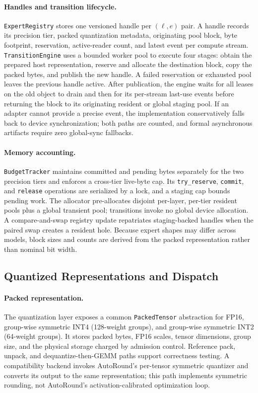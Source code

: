 \paragraph{Handles and transition lifecycle.}
\texttt{ExpertRegistry} stores one versioned handle per $(\ell,e)$ pair. A handle records its precision tier, packed quantization metadata, originating pool block, byte footprint, reservation, active-reader count, and latest event per compute stream. \texttt{TransitionEngine} uses a bounded worker pool to execute four stages: obtain the prepared host representation, reserve and allocate the destination block, copy the packed bytes, and publish the new handle. A failed reservation or exhausted pool leaves the previous handle active. After publication, the engine waits for all leases on the old object to drain and then for its per-stream last-use events before returning the block to its originating resident or global staging pool. If an adapter cannot provide a precise event, the implementation conservatively falls back to device synchronization; both paths are counted, and formal asynchronous artifacts require zero global-sync fallbacks.

\paragraph{Memory accounting.}
\texttt{BudgetTracker} maintains committed and pending bytes separately for the two precision tiers and enforces a cross-tier live-byte cap. Its \texttt{try\_reserve}, \texttt{commit}, and \texttt{release} operations are serialized by a lock, and a staging cap bounds pending work. The allocator pre-allocates disjoint per-layer, per-tier resident pools plus a global transient pool; transitions invoke no global device allocation. A compare-and-swap registry update repatriates staging-backed handles when the paired swap creates a resident hole. Because expert shapes may differ across models, block sizes and counts are derived from the packed representation rather than nominal bit width.

\subsection{Quantized Representations and Dispatch}

\paragraph{Packed representation.}
The quantization layer exposes a common \texttt{PackedTensor} abstraction for FP16, group-wise symmetric INT4 (128-weight groups), and group-wise symmetric INT2 (64-weight groups). It stores packed bytes, FP16 scales, tensor dimensions, group size, and the physical storage charged by admission control. Reference pack, unpack, and dequantize-then-GEMM paths support correctness testing. A compatibility backend invokes AutoRound's per-tensor symmetric quantizer and converts its output to the same representation; this path implements symmetric rounding, not AutoRound's activation-calibrated optimization loop.

